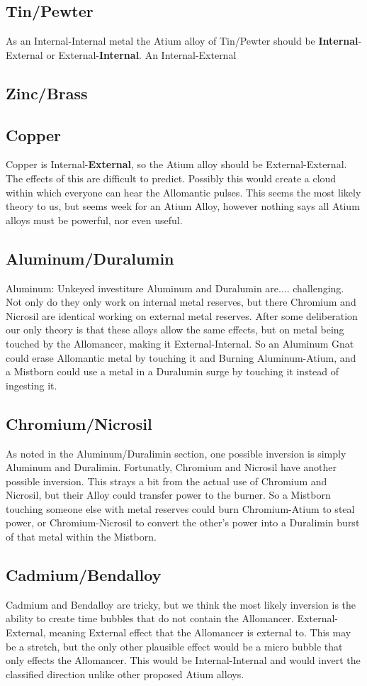 \documentclass[conference]{IEEEtran}
\begin{document}
\subsection*{Tin/Pewter}
As an Internal-Internal metal the Atium alloy of Tin/Pewter should be \textbf{Internal}-External or External-\textbf{Internal}.  An Internal-External
\subsection*{Zinc/Brass}

\subsection*{Copper}
Copper is Internal-\textbf{External}, so the Atium alloy should be External-External.  The effects of this are difficult to predict.  Possibly this would create a cloud within which everyone can hear the Allomantic pulses.
This seems the most likely theory to us, but seems week for an Atium Alloy, however nothing says all Atium alloys must be powerful, nor even useful.
\subsection*{Aluminum/Duralumin}
Aluminum: Unkeyed investiture
Aluminum and Duralumin are.... challenging.  Not only do they only work on internal metal reserves, but there Chromium and Nicrosil are identical working on external metal reserves.  After some deliberation our only theory is that these alloys allow the same effects, but on metal being touched by the Allomancer, making it External-Internal.  So an Aluminum Gnat could erase Allomantic metal by touching it and Burning Aluminum-Atium, and a Mistborn could use a metal in a Duralumin surge by touching it instead of ingesting it.
\subsection*{Chromium/Nicrosil}
As noted in the Aluminum/Duralimin section, one possible inversion is simply Aluminum and Duralimin.  Fortunatly, Chromium and Nicrosil have another possible inversion.  This strays a bit from the actual use of Chromium and Nicrosil, but their Alloy could transfer power to the burner.  So a Mistborn touching someone else with metal reserves could burn Chromium-Atium to steal power, or Chromium-Nicrosil to convert the other's power into a Duralimin burst of that metal within the Mistborn.
\subsection*{Cadmium/Bendalloy}
Cadmium and Bendalloy are tricky, but we think the most likely inversion is the ability to create time bubbles that do not contain the Allomancer.  External-External, meaning External effect that the Allomancer is external to.  This may be a stretch, but the only other plausible effect would be a micro bubble that only effects the Allomancer.  This would be Internal-Internal and would invert the classified direction unlike other proposed Atium alloys.
\end{document}

